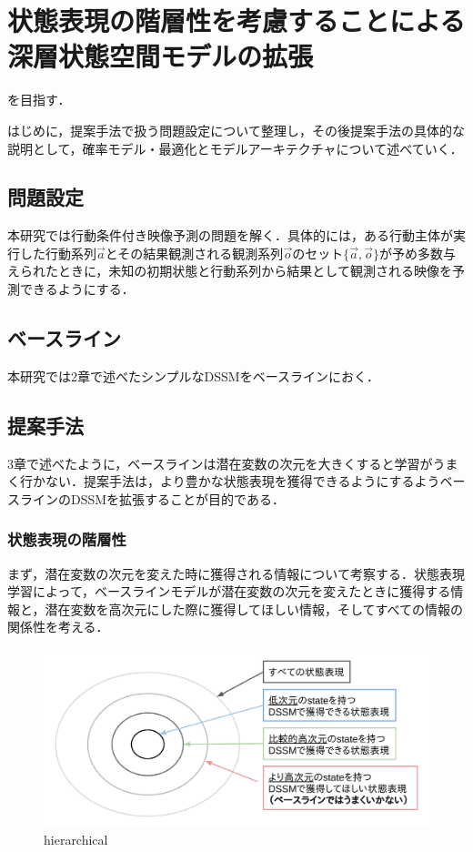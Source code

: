 \chapter{状態表現の階層性を考慮することによる深層状態空間モデルの拡張}
\label{chap:proposal}
を目指す．

はじめに，提案手法で扱う問題設定について整理し，その後提案手法の具体的な説明として，確率モデル・最適化とモデルアーキテクチャについて述べていく．

\section{問題設定}
本研究では行動条件付き映像予測の問題を解く．具体的には，ある行動主体が実行した行動系列$\vec{a}$とその結果観測される観測系列$\vec{o}$のセット$\{\vec{a}, \vec{o}\}$が予め多数与えられたときに，未知の初期状態と行動系列から結果として観測される映像を予測できるようにする．

\section{ベースライン}
本研究では2章で述べたシンプルなDSSMをベースラインにおく．

\section{提案手法}
3章で述べたように，ベースラインは潜在変数の次元を大きくすると学習がうまく行かない．提案手法は，より豊かな状態表現を獲得できるようにするようベースラインのDSSMを拡張することが目的である．

\subsection{状態表現の階層性}
まず，潜在変数の次元を変えた時に獲得される情報について考察する．状態表現学習によって，ベースラインモデルが潜在変数の次元を変えたときに獲得する情報と，潜在変数を高次元にした際に獲得してほしい情報，そしてすべての情報の関係性を考える．

\begin{figure}[tbp]
  \begin{center}
    \includegraphics[width=\linewidth]{./figures/hierarchical.png}
    \caption{hierarchical}
    \label{fig:hierarchical}
  \end{center}
\end{figure}



